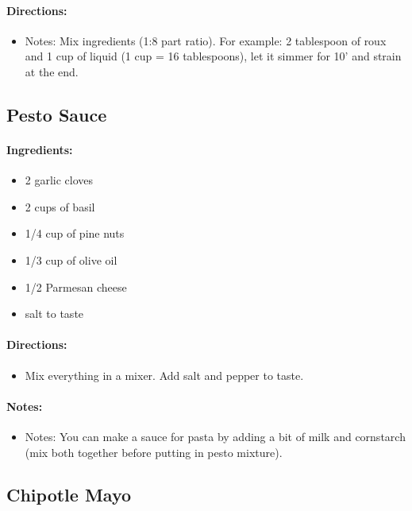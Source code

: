 \documentclass{article}
\begin{document}
\paragraph{Directions:}
\begin{itemize}
    \item Notes: Mix ingredients (1:8 part ratio). For example: 2 tablespoon of roux and 1 cup of liquid (1 cup = 16 tablespoons), let it simmer for 10' and strain at the end.
\end{itemize}

\subsection{Pesto Sauce}

\paragraph{Ingredients:}
\begin{itemize}
    \item 2 garlic cloves
    \item 2 cups of basil
    \item 1/4 cup of pine nuts
    \item 1/3 cup of olive oil
    \item 1/2 Parmesan cheese
    \item salt to taste
\end{itemize}

\paragraph{Directions:}
\begin{itemize}
    \item Mix everything in a mixer. Add salt and pepper to taste.
\end{itemize}

\paragraph{Notes:}
\begin{itemize}
    \item Notes: You can make a sauce for pasta by adding a bit of milk and cornstarch (mix both together before putting in pesto mixture).
\end{itemize}

\subsection{Chipotle Mayo}
\end{document}
